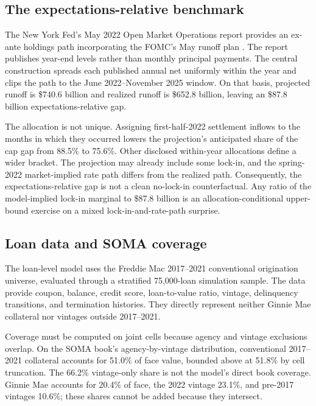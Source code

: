 \subsection{The expectations-relative benchmark}

The New York Fed's May 2022 Open Market Operations report provides an ex-ante holdings path incorporating the FOMC's May runoff plan \citep{nyfed2022}. The report publishes year-end levels rather than monthly principal payments. The central construction spreads each published annual net uniformly within the year and clips the path to the June 2022--November 2025 window. On that basis, projected runoff is \$740.6 billion and realized runoff is \$652.8 billion, leaving an \$87.8 billion expectations-relative gap.

The allocation is not unique. Assigning first-half-2022 settlement inflows to the months in which they occurred lowers the projection's anticipated share of the cap gap from 88.5\% to 75.6\%. Other disclosed within-year allocations define a wider bracket. The projection may already include some lock-in, and the spring-2022 market-implied rate path differs from the realized path. Consequently, the expectations-relative gap is not a clean no-lock-in counterfactual. Any ratio of the model-implied lock-in marginal to \$87.8 billion is an allocation-conditional upper-bound exercise on a mixed lock-in-and-rate-path surprise.

\subsection{Loan data and SOMA coverage}

The loan-level model uses the Freddie Mac 2017--2021 conventional origination universe, evaluated through a stratified 75,000-loan simulation sample. The data provide coupon, balance, credit score, loan-to-value ratio, vintage, delinquency transitions, and termination histories. They directly represent neither Ginnie Mae collateral nor vintages outside 2017--2021.

Coverage must be computed on joint cells because agency and vintage exclusions overlap. On the SOMA book's agency-by-vintage distribution, conventional 2017--2021 collateral accounts for 51.0\% of face value, bounded above at 51.8\% by cell truncation. The 66.2\% vintage-only share is not the model's direct book coverage. Ginnie Mae accounts for 20.4\% of face, the 2022 vintage 23.1\%, and pre-2017 vintages 10.6\%; these shares cannot be added because they intersect.

